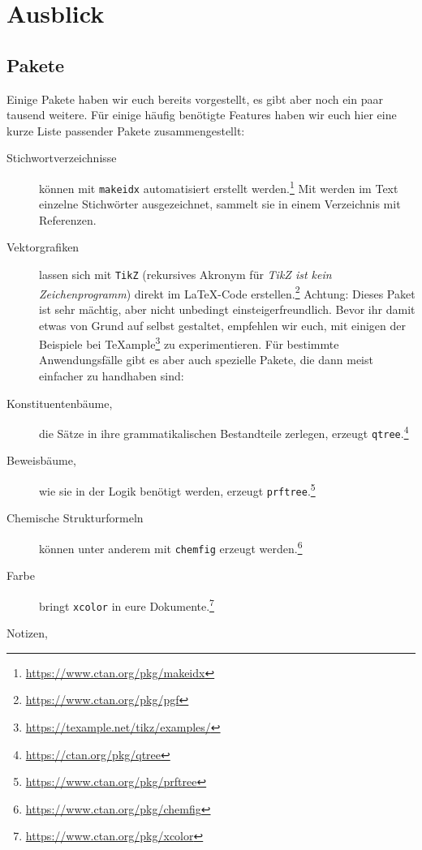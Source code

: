 \section{Ausblick}


\subsection{Pakete}

Einige Pakete haben wir euch bereits vorgestellt, es gibt aber noch ein paar tausend weitere.
Für einige häufig benötigte Features haben wir euch hier eine kurze Liste passender Pakete zusammengestellt:

\begin{description}
	\item[Stichwortverzeichnisse]
		können mit \texttt{makeidx} automatisiert erstellt werden.\footnote{\url{https://www.ctan.org/pkg/makeidx}}
		Mit \texttt{} werden im Text einzelne Stichwörter ausgezeichnet, \texttt{\printindex} sammelt sie in einem Verzeichnis mit Referenzen.
	\item[Vektorgrafiken]
		lassen sich mit \texttt{TikZ} (rekursives Akronym für \emph{TikZ ist kein Zeichenprogramm}) direkt im \LaTeX{}-Code erstellen.\footnote{\url{https://www.ctan.org/pkg/pgf}}
		Achtung: Dieses Paket ist sehr mächtig, aber nicht unbedingt einsteigerfreundlich.
		Bevor ihr damit etwas von Grund auf selbst gestaltet, empfehlen wir euch, mit einigen der Beispiele bei \TeX{}ample\footnote{\url{https://texample.net/tikz/examples/}} zu experimentieren.
		Für bestimmte Anwendungsfälle gibt es aber auch spezielle Pakete, die dann meist einfacher zu handhaben sind:
	\item[Konstituentenbäume,]
		die Sätze in ihre grammatikalischen Bestandteile zerlegen, erzeugt \texttt{qtree}.\footnote{\url{https://ctan.org/pkg/qtree}}
	\item[Beweisbäume,]
		wie sie in der Logik benötigt werden, erzeugt \texttt{prftree}.\footnote{\url{https://www.ctan.org/pkg/prftree}}
	\item[Chemische Strukturformeln]
		können unter anderem mit \texttt{chemfig} erzeugt werden.\footnote{\url{https://www.ctan.org/pkg/chemfig}}
	\item[Farbe]
		bringt \texttt{xcolor} in eure Dokumente.\footnote{\url{https://www.ctan.org/pkg/xcolor}}
	\item[Notizen,]

\end{description}
